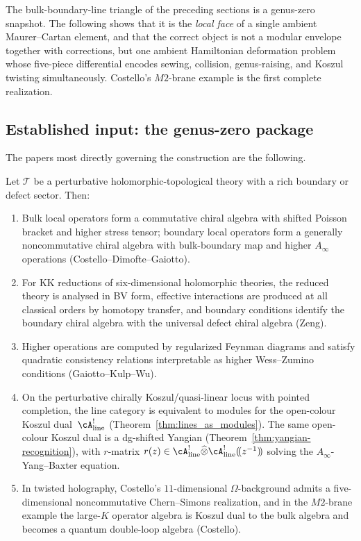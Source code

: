The bulk-boundary-line triangle of the preceding sections
is a genus-zero snapshot. The following shows that it is the \emph{local face}
of a single ambient Maurer--Cartan element, and that the correct
object is not a modular envelope together with corrections, but one
ambient Hamiltonian deformation problem whose five-piece differential
encodes sewing, collision, genus-raising, and Koszul twisting
simultaneously. Costello's $M2$-brane example is the first
complete realization.

\subsection{Established input: the genus-zero package}
\label{subsec:established-genus-zero-package}

The papers most directly governing the construction are the
following.

\begin{theorem}
\label{thm:genus-zero-holographic-spine}
\ClaimStatusProvedElsewhere
Let $\mathcal{T}$ be a perturbative holomorphic-topological theory
with a rich boundary or defect sector. Then:
\begin{enumerate}[label=\textup{(\arabic*)}]
\item Bulk local operators form a commutative chiral algebra with
shifted Poisson bracket and higher stress tensor; boundary local
operators form a generally noncommutative chiral algebra with
bulk-boundary map and higher $A_\infty$ operations
\textup{(Costello--Dimofte--Gaiotto)}.
\item For KK reductions of six-dimensional holomorphic theories,
the reduced theory is analysed in BV form, effective interactions
are produced at all classical orders by homotopy transfer, and
boundary conditions identify the boundary chiral algebra with the
universal defect chiral algebra \textup{(Zeng)}.
\item Higher operations are computed by regularized Feynman diagrams
and satisfy quadratic consistency relations interpretable as higher
Wess--Zumino conditions \textup{(Gaiotto--Kulp--Wu)}.
\item On the perturbative chirally Koszul/quasi-linear locus with
 pointed completion, the line category is equivalent to modules for
 the open-colour Koszul dual~$\cA^!_{\mathrm{line}}$
 \textup{(}Theorem~\textup{\ref{thm:lines_as_modules}}\textup{)}.
 The same open-colour Koszul dual is a dg-shifted Yangian
 \textup{(}Theorem~\textup{\ref{thm:yangian-recognition}}\textup{)},
 with $r$-matrix
 $r(z) \in \cA^!_{\mathrm{line}} \widehat\otimes
 \cA^!_{\mathrm{line}}(\!(z^{-1})\!)$
 solving the $A_\infty$-Yang--Baxter equation.
\item In twisted holography, Costello's $11$-dimensional
$\Omega$-background admits a five-dimensional noncommutative
Chern--Simons realization, and in the $M2$-brane example the
large-$K$ operator algebra is Koszul dual to the bulk algebra
and becomes a quantum double-loop algebra \textup{(Costello)}.
\end{enumerate}
\end{theorem}

